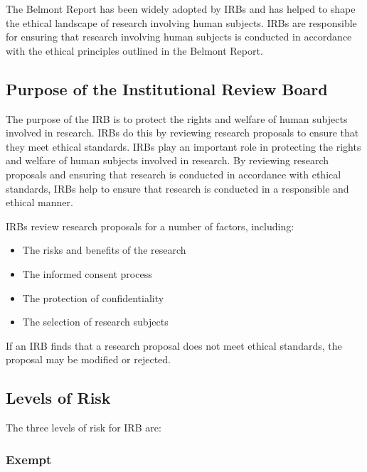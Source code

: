 \documentclass[
  b5paper]{book}
\providecommand{\tightlist}{%
  \setlength{\itemsep}{0pt}\setlength{\parskip}{0pt}}
\begin{document}
The Belmont Report has been widely adopted by IRBs and has helped to shape the ethical landscape of research involving human subjects. IRBs are responsible for ensuring that research involving human subjects is conducted in accordance with the ethical principles outlined in the Belmont Report.

\hypertarget{purpose-of-the-institutional-review-board}{%
\subsection*{Purpose of the Institutional Review Board}\label{purpose-of-the-institutional-review-board}}

The purpose of the IRB is to protect the rights and welfare of human subjects involved in research. IRBs do this by reviewing research proposals to ensure that they meet ethical standards. IRBs play an important role in protecting the rights and welfare of human subjects involved in research. By reviewing research proposals and ensuring that research is conducted in accordance with ethical standards, IRBs help to ensure that research is conducted in a responsible and ethical manner.

IRBs review research proposals for a number of factors, including:

\begin{itemize}
\tightlist
\item
  The risks and benefits of the research
\item
  The informed consent process
\item
  The protection of confidentiality
\item
  The selection of research subjects
\end{itemize}

If an IRB finds that a research proposal does not meet ethical standards, the proposal may be modified or rejected.

\hypertarget{levels-of-risk}{%
\subsection*{Levels of Risk}\label{levels-of-risk}}

The three levels of risk for IRB are:

\hypertarget{exempt}{%
\subsubsection*{Exempt}\label{exempt}}
\end{document}
